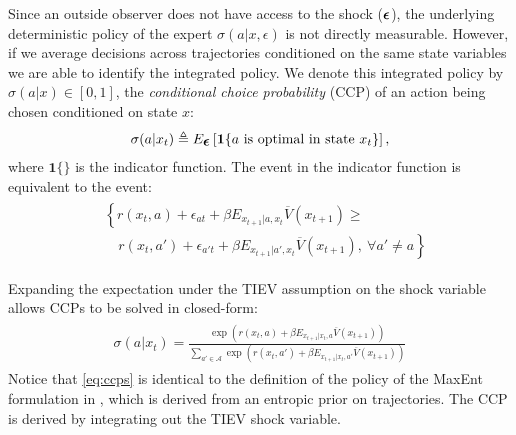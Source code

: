 \documentclass{article}
\renewcommand{\vec}[1]{\mbox{\bm{$#1$}}}
\begin{document}
Since an outside observer does not have access to the shock ($\vec{\epsilon}$), the underlying deterministic policy of the expert $\sigma(a | x,\epsilon)$ is not directly measurable. However, if we average decisions across trajectories conditioned on the same state variables we are able to identify the integrated policy. We denote this integrated policy by $\sigma(a|x)\in[0,1]$, the \emph{conditional choice probability} (CCP) of an action being chosen conditioned on state $x$: 
\begin{eqnarray}
\sigma(a|x_t)\triangleq E_{\vec{\epsilon}}\left[ \mathbf{1}\{a\ \textrm{is optimal in state }x_t\}\right],
\end{eqnarray}
where $\mathbf{1}\{\}$ is the indicator function. The event in the indicator function is equivalent to the event:
\begin{align}
\begin{split}
& \left\{r(x_t,a)+\epsilon_{at}+\beta E_{x_{t+1}|a,x_t} \overline{V}(x_{t+1})\geq \right. \\
& \quad \left. r(x_t,a')+\epsilon_{a't}+\beta E_{x_{t+1}|a',x_t} \overline{V}(x_{t+1}),\ \forall a'\neq a \right\}
\end{split}
\end{align}

Expanding the expectation under the TIEV assumption on the shock variable allows CCPs to be solved in closed-form:
\begin{align} \label{eq:ccps}
\begin{split}
\sigma(a|x_t)=\frac{\exp\left(r(x_t,a)+\beta E_{x_{t+1}|x_t,a} \overline{V}(x_{t+1})\right)}{\sum_{a'\in\mathcal{A}} \exp\left(r(x_t,a')+\beta E_{x_{t+1}|x_t,a'} \overline{V}(x_{t+1})\right)}
\end{split}
\end{align}
Notice that \eqref{eq:ccps} is identical to the definition of the policy of the MaxEnt formulation in \cite{ziebart_phd}, which is derived from an entropic prior on trajectories. The CCP is derived by integrating out the TIEV shock variable. 
\end{document}
